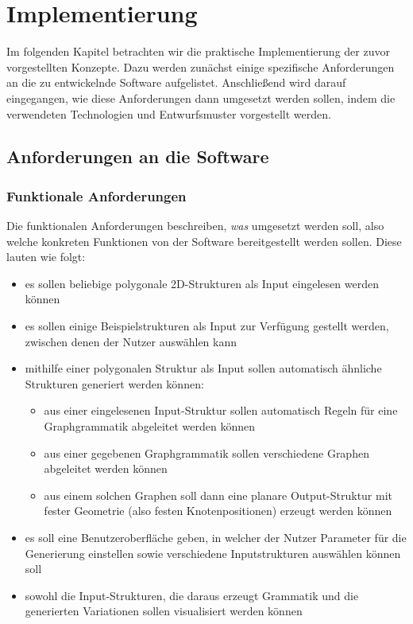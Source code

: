 %
\chapter{Implementierung}
Im folgenden Kapitel betrachten wir die praktische Implementierung der zuvor vorgestellten Konzepte. Dazu werden zunächst
einige spezifische Anforderungen an die zu entwickelnde Software aufgelistet. Anschließend wird darauf eingegangen, wie
diese Anforderungen dann umgesetzt werden sollen, indem die verwendeten Technologien und Entwurfsmuster vorgestellt werden.

\section{Anforderungen an die Software}
\subsection{Funktionale Anforderungen}
Die funktionalen Anforderungen beschreiben, \textit{was} umgesetzt werden soll, also welche konkreten Funktionen von der Software
bereitgestellt werden sollen. Diese lauten wie folgt:

\begin{itemize}
    \item es sollen beliebige polygonale 2D-Strukturen als Input eingelesen werden können
    \item es sollen einige Beispielstrukturen als Input zur Verfügung gestellt werden, zwischen denen der Nutzer auswählen kann
    \item mithilfe einer polygonalen Struktur als Input sollen automatisch ähnliche Strukturen generiert werden können:
    \begin{itemize}
        \item aus einer eingelesenen Input-Struktur sollen automatisch Regeln für eine Graphgrammatik abgeleitet werden können
        \item aus einer gegebenen Graphgrammatik sollen verschiedene Graphen abgeleitet werden können
        \item aus einem solchen Graphen soll dann eine planare Output-Struktur mit fester Geometrie (also festen Knotenpositionen) erzeugt werden können
    \end{itemize}
    \item es soll eine Benutzeroberfläche geben, in welcher der Nutzer Parameter für die Generierung einstellen sowie verschiedene Inputstrukturen auswählen können soll
    \item sowohl die Input-Strukturen, die daraus erzeugt Grammatik und die generierten Variationen sollen visualisiert werden können
\end{itemize}

